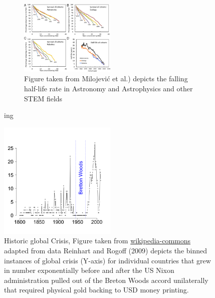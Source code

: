 \documentclass[final,5p,times,twocolumn,authoryear]{elsarticle}
\begin{document}
\begin{figure}[h!]
\begin{figure}[h!]
    \centering
    \label{fig:F4.large}
  \caption{Figure taken from Milojević et al.) depicts the falling half-life rate in Astronomy and Astrophysics and other STEM fields}
  \includegraphics[width=0.5\textwidth]{figs/F4.large.jpg}
\end{figure}ing
    \label{fig:crisis}
  \caption{Historic global Crisis, Figure taken from \href{https://en.wikipedia.org/wiki/Global_recession}{wikipedia-commons} adapted from data Reinhart and Rogoff (2009) depicts the binned instances of global crisis (Y-axis) for individual countries that grew in number exponentially before and after the US Nixon administration pulled out of the Breton Woods accord unilaterally that required physical gold backing to USD money printing.}
  \includegraphics[width=0.5\textwidth]{figs/330px-BankingCrises.svg.png}
\end{figure}
\end{document}
